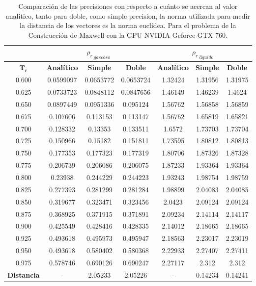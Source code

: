 \begin{table}[h!]
\centering
	\begin{tabular}{|c|c|c|c|c|c|c|}
	\hline
	& \multicolumn{3}{c|}{${\rho_{r}}_{\>gaseoso}$}      & \multicolumn{3}{c|}{${\rho_{r}}_{\>líquido}$} \\ \hline
	$\mathbf{T_r}$    & \textbf{Analítico}      & \textbf{Simple}       & \textbf{Doble}     & \textbf{Analítico}      & \textbf{Simple}     & \textbf{Doble}   \\ \hline
	0.600 & 0.0599097 & 0.0653772 & 0.0653724 & 1.32424  & 1.31956 & 1.31975 \\ \hline
	0.625 & 0.0733723 & 0.0848112 & 0.0847656 & 1.46149  & 1.46239 & 1.4624  \\ \hline
	0.650 & 0.0897449 & 0.0951336 & 0.095124  & 1.56762  & 1.56858 & 1.56859 \\ \hline
	0.675 & 0.107606  & 0.113153  & 0.113147  & 1.56762  & 1.65819 & 1.65821 \\ \hline
	0.700 & 0.128332  & 0.13353   & 0.133511  & 1.6572   & 1.73703 & 1.73704 \\ \hline
	0.725 & 0.150966  & 0.15182   & 0.151811  & 1.73595  & 1.80812 & 1.80813 \\ \hline
	0.750 & 0.177353  & 0.177323  & 0.177319  & 1.80706  & 1.87326 & 1.87328 \\ \hline
	0.775 & 0.206739  & 0.206086  & 0.206075  & 1.87233  & 1.93364 & 1.93364 \\ \hline
	0.800 & 0.23938   & 0.244229  & 0.244223  & 1.93243  & 1.98754 & 1.98759 \\ \hline
	0.825 & 0.277393  & 0.281299  & 0.281284  & 1.98899  & 2.04083 & 2.04085 \\ \hline
	0.850 & 0.319677  & 0.323471  & 0.323456  & 2.0423   & 2.09124 & 2.09124 \\ \hline
	0.875 & 0.368925  & 0.371915  & 0.371891  & 2.09234  & 2.14114 & 2.14117 \\ \hline
	0.900 & 0.425549  & 0.428416  & 0.428335  & 2.14012  & 2.18665 & 2.18665 \\ \hline
	0.925 & 0.493618  & 0.495973  & 0.495947  & 2.18563  & 2.23017 & 2.23019 \\ \hline
	0.950 & 0.493618  & 0.580402  & 0.580368  & 2.22933  & 2.27407 & 2.27411 \\ \hline
	0.975 & 0.578746  & 0.690126  & 0.690247  & 2.27117  & 2.312   & 2.312   \\ \hline
	\textbf{Distancia} & -         & 2.05233   & 2.05226   & -        & 0.14234 & 0.14241 \\ \hline
\end{tabular}%
    \caption{Comparación de las precisiones con respecto a cuánto se acercan al valor analitico, tanto para doble, como simple precision, la norma utilizada para medir la distancia de los vectores es la norma  euclídea. Para el problema de la Construcción de Maxwell con la GPU NVIDIA Geforce GTX 760.}
    \label{tab:comp_MxC_precisiones_10}
    \end{table}

